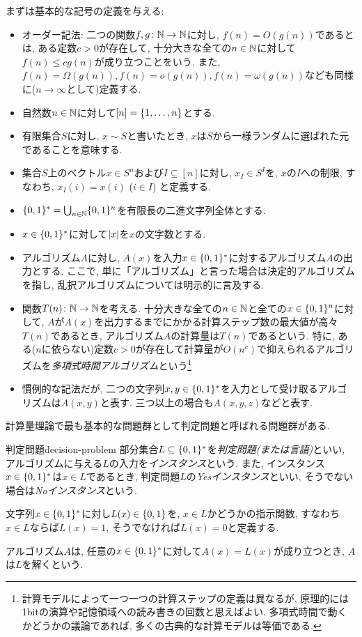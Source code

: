 まずは基本的な記号の定義を与える:
\begin{itemize}
\item オーダー記法: 二つの関数$f,g\colon\mathbb{N}\to\mathbb{N}$に対し, $f(n)=O(g(n))$であるとは, ある定数$c>0$が存在して, 十分大きな全ての$n\in\mathbb{N}$に対して$f(n)\le cg(n)$が成り立つことをいう. また, $f(n)=\Omega(g(n)), f(n)=o(g(n)), f(n)=\omega(g(n))$なども同様に($n\to\infty$として)定義する.
\item 自然数$n\in\mathbb{N}$に対して$[n]=\qty{1,\dots,n}$とする.
\item 有限集合$S$に対し, $x\sim S$と書いたとき, $x$は$S$から一様ランダムに選ばれた元であることを意味する.
\item 集合$S$上のベクトル$x\in S^n$および$I\subseteq[n]$に対し, $x_I \in S^I$を, $x$の$I$への制限, すなわち, $x_I(i)=x(i)$ ($i\in I$) と定義する.
\item $\{0,1\}^*=\bigcup_{n\in\mathbb{N}}\{0,1\}^n$を有限長の二進文字列全体とする.
\item $x\in\{0,1\}^*$に対して$\abs{x}$を$x$の文字数とする.
\item アルゴリズム$A$に対し, $A(x)$を入力$x \in \{0,1\}^*$に対するアルゴリズム$A$の出力とする. ここで, 単に「アルゴリズム」と言った場合は決定的アルゴリズムを指し, 乱択アルゴリズムについては明示的に言及する.
\item 関数$T(n)\colon\mathbb{N}\to\mathbb{N}$を考える. 十分大きな全ての$n\in\mathbb{N}$と全ての$x\in\{0,1\}^n$に対して, $A$が$A(x)$を出力するまでにかかる計算ステップ数の最大値が高々$T(n)$であるとき, アルゴリズム$A$の計算量は$T(n)$であるという. 特に, ある($n$に依らない)定数$c>0$が存在して計算量が$O(n^c)$で抑えられるアルゴリズムを\emph{多項式時間アルゴリズム}という\footnote{計算モデルによって一つ一つの計算ステップの定義は異なるが, 原理的には1bitの演算や記憶領域への読み書きの回数と思えばよい. 多項式時間で動くかどうかの議論であれば, 多くの古典的な計算モデルは等価である.}
\item 慣例的な記法だが, 二つの文字列$x,y\in\{0,1\}^*$を入力として受け取るアルゴリズムは$A(x,y)$と表す. 三つ以上の場合も$A(x,y,z)$などと表す.
\end{itemize}

計算量理論で最も基本的な問題群として判定問題と呼ばれる問題群がある.

\begin{definition}{判定問題}{decision-problem}
  部分集合$L\subseteq\{0,1\}^*$を\emph{判定問題(または言語)}といい,
  アルゴリズムに与える$L$の入力を\emph{インスタンス}という.
  また, インスタンス$x\in\{0,1\}^*$は$x\in L$であるとき, 判定問題$L$の\emph{Yesインスタンス}といい,
  そうでない場合は\emph{Noインスタンス}という.

  文字列$x\in\{0,1\}^*$に対し$L(x)\in\{0,1\}$を, $x\in L$かどうかの指示関数, すなわち$x\in L$ならば$L(x)=1$, そうでなければ$L(x)=0$と定義する.

  アルゴリズム$A$は, 任意の$x\in\{0,1\}^*$に対して$A(x)=L(x)$が成り立つとき,
  $A$は$L$を解くという.
\end{definition}


